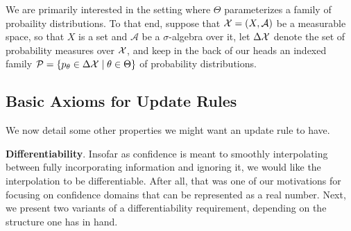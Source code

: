 \documentclass{article}
\begin{document}
%



We are primarily interested in the setting where $\Theta$ parameterizes a family of probaility distributions.
To that end, suppose that $\mathcal X = (X, \mathcal A)$ be a measurable space, so that $X$ is a set and $\mathcal A$ be a $\sigma$-algebra over it, let $\Delta \mathcal X$ denote the set of probability measures over $\mathcal X$,
and keep in the back of our heads an indexed family
$
    \mathcal P =
    \{ p_\theta \in\Delta\mathcal X \mid \theta \in \Theta \}
$ of probability distributions.

%



\subsection{Basic Axioms for Update Rules}

We now detail some other properties we might want an update rule to have.

\textbf{Differentiability}.
Insofar as confidence is meant to smoothly interpolating between fully incorporating information and ignoring it, we would like the interpolation to be differentiable.
After all, that was one of our motivations for focusing on confidence domains that can be represented as a real number.
Next, we present two variants of a differentiability requirement, depending on the structure one has in hand. 
\end{document}

